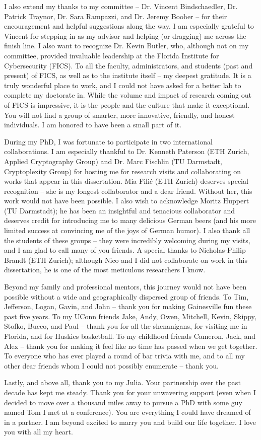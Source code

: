 I also extend my thanks to my committee -- Dr. Vincent Bindschaedler, Dr. Patrick Traynor, Dr. Sara Rampazzi, and Dr. Jeremy Booher -- for their encouragement and helpful suggestions along the way. I am especially grateful to Vincent for stepping in as my advisor and helping (or dragging) me across the finish line. I also want to recognize Dr. Kevin Butler, who, although not on my committee, provided invaluable leadership at the Florida Institute for Cybersecurity (FICS). To all the faculty, administrators, and students (past and present) of FICS, as well as to the institute itself -- my deepest gratitude. It is a truly wonderful place to work, and I could not have asked for a better lab to complete my doctorate in. While the volume and impact of research coming out of FICS is impressive, it is the people and the culture that make it exceptional. You will not find a group of smarter, more innovative, friendly, and honest individuals. I am honored to have been a small part of it.

During my PhD, I was fortunate to participate in two international collaborations. I am especially thankful to Dr. Kenneth Paterson (ETH Zurich, Applied Cryptography Group) and Dr. Marc Fischlin (TU Darmstadt, Cryptoplexity Group) for hosting me for research visits and collaborating on works that appear in this dissertation. Mia Filić (ETH Zurich) deserves special recognition -- she is my longest collaborator and a dear friend. Without her, this work would not have been possible. I also wish to acknowledge Moritz Huppert (TU Darmstadt); he has been an insightful and tenacious collaborator and deserves credit for introducing me to many delicious German beers (and his more limited success at convincing me of the joys of German humor). I also thank all the students of these groups -- they were incredibly welcoming during my visits, and I am glad to call many of you friends. A special thanks to Nicholas-Philip Brandt (ETH Zurich); although Nico and I did not collaborate on work in this dissertation, he is one of the most meticulous researchers I know.

Beyond my family and professional mentors, this journey would not have been possible without a wide and geographically dispersed group of friends. To Tim, Jefferson, Logan, Gavin, and John -- thank you for making Gainesville fun these past five years. To my UConn friends Jake, Andy, Owen, Mitchell, Kevin, Skippy, Stofko, Bucco, and Paul -- thank you for all the shenanigans, for visiting me in Florida, and for Huskies basketball. To my childhood friends Cameron, Jack, and Alex -- thank you for making it feel like no time has passed when we get together. To everyone who has ever played a round of bar trivia with me, and to all my other dear friends whom I could not possibly enumerate -- thank you.

Lastly, and above all, thank you to my Julia. Your partnership over the past decade has kept me steady. Thank you for your unwavering support (even when I decided to move over a thousand miles away to pursue a PhD with some guy named Tom I met at a conference). You are everything I could have dreamed of in a partner. I am beyond excited to marry you and build our life together. I love you with all my heart.